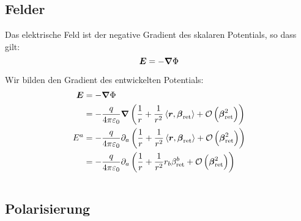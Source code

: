 \fehlt

\subsection{Felder}

Das elektrische Feld ist der negative Gradient des skalaren Potentials, so dass gilt:
\[
	\boldsymbol{E} = - \boldsymbol{\nabla} \Phi
\]

Wir bilden den Gradient des entwickelten Potentials:
\begin{align*}
	\vec E
	&= - \vnabla \Phi \\
	&= - \frac{q}{4 \pi \varepsilon_0} \vnabla \del{\frac 1r + \frac{1}{r^2}\inner{\vec r}{\vec \beta_\text{ret}} + \mathcal O\del{\vec \beta_\text{ret}^2}} \\ 
	E^a
	&= - \frac{q}{4 \pi \varepsilon_0} \partial_a \del{\frac 1r + \frac{1}{r^2}\inner{\vec r}{\vec \beta_\text{ret}} + \mathcal O\del{\vec \beta_\text{ret}^2}} \\ 
	&= - \frac{q}{4 \pi \varepsilon_0} \partial_a \del{\frac 1r + \frac{1}{r^2} r_b \beta_\text{ret}^b + \mathcal O\del{\vec \beta_\text{ret}^2}} \\ 
	\intertext{%
	}
\end{align*}

\subsection{Polarisierung}

\fehlt

%
%



